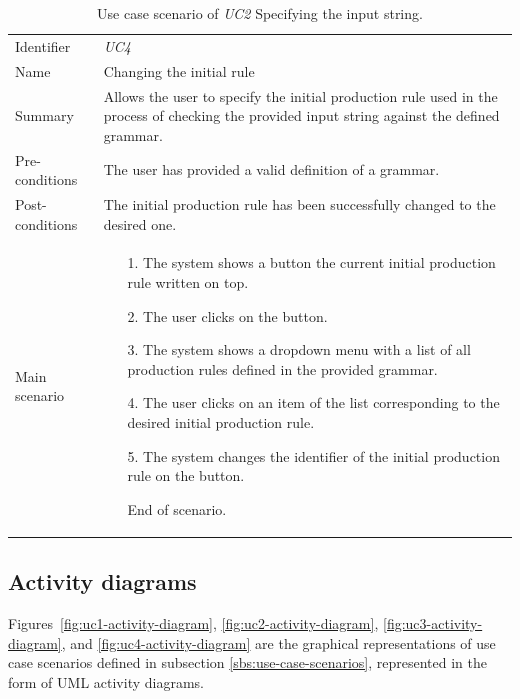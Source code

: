\documentclass[english,engineering]{wizthesis}
\begin{document}
\begin{xltabular}{\textwidth}{@{}L{3cm}X@{}}
  \caption{Use case scenario of \emph{UC2} Specifying the input string.}
  \label{tab:uc4-scenario}\\
  \toprule
  \endfirsthead
  \endhead
  \endfoot
  \endlastfoot
  Identifier & \emph{UC4} \\
  \addlinespace[0.5em] Name & Changing the initial rule \\
  \addlinespace[0.5em] Summary & Allows the user to specify the initial
  production rule used in the process of checking the provided input string
  against the defined grammar. \\
  \addlinespace[0.5em] Pre-conditions & The user has provided a valid definition
  of a grammar. \\
  \addlinespace[0.5em] Post-conditions & The initial production rule has been
  successfully changed to the desired one. \\
  \addlinespace[0.5em] Main scenario &
  \begin{enumerate}[noitemsep,nolistsep,labelindent=0.5cm,align=right]
    \item [1.] The system shows a button the current initial production rule
    written on top.
    \item [2.] The user clicks on the button.
    \item [3.] The system shows a dropdown menu with a list of all production
    rules defined in the provided grammar.
    \item [4.] The user clicks on an item of the list corresponding to the
    desired initial production rule.
    \item [5.] The system changes the identifier of the initial production rule
    on the button.
    \item [] End of scenario.
  \end{enumerate} \\* \bottomrule
\end{xltabular}

\subsection{Activity diagrams}

Figures~\ref{fig:uc1-activity-diagram}, \ref{fig:uc2-activity-diagram},
\ref{fig:uc3-activity-diagram}, and \ref{fig:uc4-activity-diagram} are the
graphical representations of use case scenarios defined in subsection
\ref{sbs:use-case-scenarios}, represented in the form of UML activity diagrams.
\end{document}
